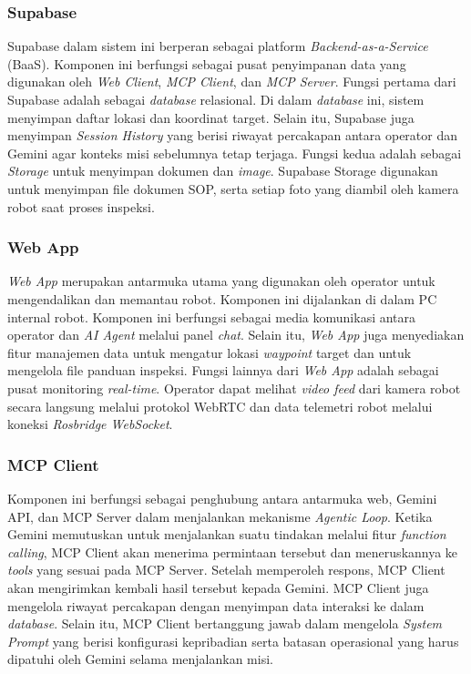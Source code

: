 \subsubsection{Supabase}

Supabase dalam sistem ini berperan sebagai platform \textit{Backend-as-a-Service} (BaaS). Komponen ini berfungsi sebagai pusat penyimpanan data yang digunakan oleh \textit{Web Client}, \textit{MCP Client}, dan \textit{MCP Server}. Fungsi pertama dari Supabase adalah sebagai \textit{database} relasional. Di dalam \textit{database} ini, sistem menyimpan daftar lokasi dan koordinat target. Selain itu, Supabase juga menyimpan \textit{Session History} yang berisi riwayat percakapan antara operator dan Gemini agar konteks misi sebelumnya tetap terjaga. Fungsi kedua adalah sebagai \textit{Storage} untuk menyimpan dokumen dan \textit{image}. Supabase Storage digunakan untuk menyimpan file dokumen SOP, serta setiap foto yang diambil oleh kamera robot saat proses inspeksi.

\subsubsection{Web App}

\textit{Web App} merupakan antarmuka utama yang digunakan oleh operator untuk mengendalikan dan memantau robot. Komponen ini dijalankan di dalam PC internal robot. Komponen ini berfungsi sebagai media komunikasi antara operator dan \textit{AI Agent} melalui panel \textit{chat}. Selain itu, \textit{Web App} juga menyediakan fitur manajemen data untuk mengatur lokasi \textit{waypoint} target dan untuk mengelola file panduan inspeksi. Fungsi lainnya dari \textit{Web App} adalah sebagai pusat monitoring \textit{real-time}. Operator dapat melihat \textit{video feed} dari kamera robot secara langsung melalui protokol WebRTC dan data telemetri robot melalui koneksi \textit{Rosbridge WebSocket}.

\subsubsection{MCP Client }
Komponen ini berfungsi sebagai penghubung antara antarmuka web, Gemini API, dan MCP Server dalam menjalankan mekanisme \textit{Agentic Loop}. Ketika Gemini memutuskan untuk menjalankan suatu tindakan melalui fitur \textit{function calling}, MCP Client akan menerima permintaan tersebut dan meneruskannya ke \textit{tools} yang sesuai pada MCP Server. Setelah memperoleh respons, MCP Client akan mengirimkan kembali hasil tersebut kepada Gemini. MCP Client juga mengelola riwayat percakapan dengan menyimpan data interaksi ke dalam \textit{database}. Selain itu, MCP Client bertanggung jawab dalam mengelola \textit{System Prompt} yang berisi konfigurasi kepribadian serta batasan operasional yang harus dipatuhi oleh Gemini selama menjalankan misi.

